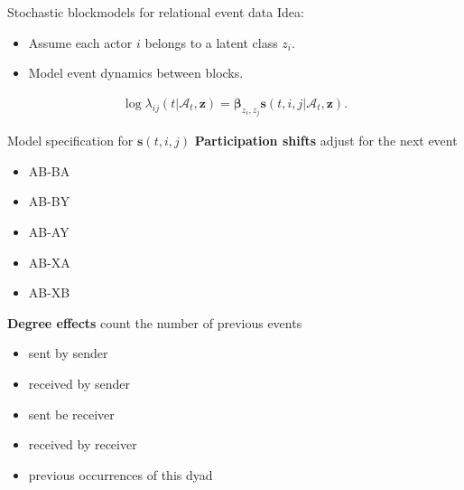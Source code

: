 \documentclass{beamer}
\begin{document}
\begin{frame}{Stochastic blockmodels for relational event data}
Idea: 
  \begin{itemize}
  \item Assume each actor $i$ belongs to a latent class $z_i$.
  \item Model event dynamics between blocks.
  \end{itemize}

\begin{align}
\log \lambda_{ij}(t | \mathcal{A}_t,\mathbf{z}) = \boldsymbol{\beta}_{z_i,z_j} \mathbf{s}(t,i,j|\mathcal{A}_t,\mathbf{z}).
\end{align}



\end{frame}

\begin{frame}{Model specification for $\mathbf{s}(t,i,j)$}
\textbf{Participation shifts} adjust for the next event
\begin{itemize}
\item AB-BA
\item AB-BY
\item AB-AY
\item AB-XA
\item AB-XB
\end{itemize}

\textbf{Degree effects} count the number of previous events
\begin{itemize}
\item sent by sender
\item received by sender
\item sent be receiver
\item received by receiver
\item previous occurrences of this dyad
\end{itemize}

\end{frame}
\end{document}
